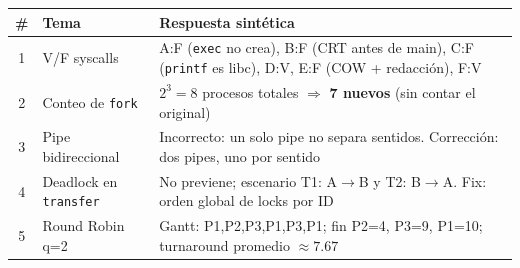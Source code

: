 \documentclass[11pt,a4paper]{article}
\begin{document}
\begin{center}
\small
\begin{tabular}{@{}clp{8.5cm}@{}}
\toprule
\# & Tema & Respuesta sintética \\
\midrule
1 & V/F syscalls         & A:F (\texttt{exec} no crea), B:F (CRT antes de main), C:F (\texttt{printf} es libc), D:V, E:F (COW + redacción), F:V \\
2 & Conteo de \texttt{fork} & $2^3 = 8$ procesos totales $\Rightarrow$ \textbf{7 nuevos} (sin contar el original) \\
3 & Pipe bidireccional   & Incorrecto: un solo pipe no separa sentidos. Corrección: dos pipes, uno por sentido \\
4 & Deadlock en \texttt{transfer} & No previene; escenario T1: A$\to$B y T2: B$\to$A. Fix: orden global de locks por ID \\
5 & Round Robin q=2      & Gantt: P1,P2,P3,P1,P3,P1; fin P2=4, P3=9, P1=10; turnaround promedio $\approx 7.67$ \\
\bottomrule
\end{tabular}
\end{center}
\end{document}
